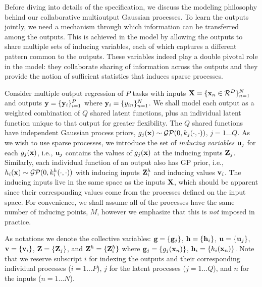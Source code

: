 Before diving into details of the specification, we discuss the modeling philosophy behind our collaborative multioutput Gaussian processes.
To learn the outputs jointly, we need a mechanism through which information can be transferred among the outputs.
This is achieved in the model by allowing the outputs to share multiple sets of inducing variables, each of which captures a different pattern common to the outputs.
These variables indeed play a double pivotal role in the model: they collaborate sharing of information across the outputs and they provide the notion of  sufficient statistics that induces sparse processes. 

\newcommand{\Zj}{\Z_j}
\newcommand{\Zhi}{\Z^h_i}
Consider multiple output regression of $P$ tasks with inputs $\mathbf{X} = \{\mathbf{x}_n \in \mathcal{R}^D\}_{n=1}^N$ and outputs $\mathbf{y} = \{\mathbf{y}_i\}_{i=1}^P$ where $\mathbf{y}_i = \{y_{in}\}_{n=1}^N$.
We shall model each output as a weighted combination of $Q$ shared latent functions, plus an individual latent function unique to that output for greater flexibility.
The $Q$ shared functions have independent Gaussian process priors, $g_j(\mathbf{x}) \sim \mathcal{GP}(0, k_j(\cdot,\cdot))$, $j= 1 \hdots Q$.
As we wish to use sparse processes, we introduce the set of \emph{inducing variables} $\mathbf{u}_j$ for  each $g_j(\mathbf{x})$, i.e., $\mathbf{u}_j$ contains the values of $g_j(\mathbf{x})$ at the inducing inputs $\mathbf{Z}_j$.
Similarly, each individual function of an output also has GP prior, i.e., $h_i(\mathbf{x}) \sim \mathcal{GP}(0, k^h_i(\cdot,\cdot))$ with inducing inputs $\Zhi$ and inducing values $\mathbf{v}_i$.
The inducing inputs live in the same space as the inputs $\mathbf{X}$, which should be apparent since their corresponding values come from the processes defined on the input space.
For convenience, we shall assume all of the processes have the same number of inducing points, $M$, however we emphasize that this is \emph{not} imposed in practice.


As notations we denote the collective variables: $\mathbf{g} = \{\mathbf{g}_j\}$, $\mathbf{h} = \{\mathbf{h}_i \}$, $\mathbf{u} = \{\mathbf{u}_j\}$, $\mathbf{v} = \{\mathbf{v}_i\}$, $\Z = \{\Zj\}$, and $\Z^h = \{\Zhi \}$ where $\mathbf{g}_j = \{g_j(\mathbf{x}_n)\}$, $\mathbf{h}_i = \{h_i(\mathbf{x}_n)\}$. 
Note that we reserve subscript $i$ for indexing the outputs and their corresponding individual processes ($i = 1 \hdots P$), $j$ for the latent processes ($j = 1 \hdots Q$), and $n$ for the inputs ($n = 1 \hdots N$).

